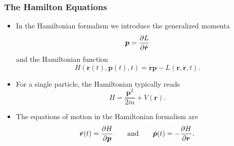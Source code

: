 \documentclass[11pt, a4paper]{article}
\renewcommand{\vec}[1]{\bm{#1}} %
\renewcommand{\r}{\vec{r}}
\begin{document}
\subsubsection{The Hamilton Equations}
\begin{itemize}
    \item In the Hamiltonian formalism we introduce the generalized momenta
    \begin{equation*}
        \vec{p} = \pdv{L}{ \dot{\r}}
    \end{equation*}
    and the Hamiltonian function
    \begin{equation*}
        H(\r(t), \vec{p}(t), t) = \dot{\vec{r}} \vec{p} - L(\r, \dot{\vec{r}}, t).
    \end{equation*}

    \item For a single particle, the Hamiltonian typically reads
    \begin{equation*}
        H = \frac{ \vec{p}^{2}}{2m} + V(\r).
    \end{equation*}
    
    \item The equations of motion in the Hamiltonian formalism are
    \begin{equation*}
        \dot{\vec{r}}(t) = \pdv{H}{ \vec{p}} \qquad \text{and} \qquad \dot{\vec{p}}(t) = - \pdv{H}{\r}.
    \end{equation*}
    
\end{itemize}
\end{document}
